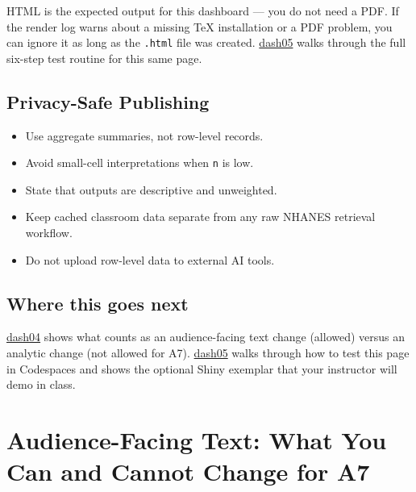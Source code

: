 \documentclass[
  letterpaper,
  DIV=11,
  numbers=noendperiod,
  oneside]{scrreprt}
\providecommand{\tightlist}{%
  \setlength{\itemsep}{0pt}\setlength{\parskip}{0pt}}
\begin{document}
HTML is the expected output for this dashboard --- you do not need a
PDF. If the render log warns about a missing TeX installation or a PDF
problem, you can ignore it as long as the \texttt{.html} file was
created. \href{dash05-testing-privacy-and-shiny-demo.qmd}{dash05} walks
through the full six-step test routine for this same page.

\section*{Privacy-Safe Publishing}\label{privacy-safe-publishing}


\begin{itemize}
\tightlist
\item
  Use aggregate summaries, not row-level records.
\item
  Avoid small-cell interpretations when \texttt{n} is low.
\item
  State that outputs are descriptive and unweighted.
\item
  Keep cached classroom data separate from any raw NHANES retrieval
  workflow.
\item
  Do not upload row-level data to external AI tools.
\end{itemize}

\section*{Where this goes next}\label{where-this-goes-next-16}


\href{dash04-audience-and-ui-text.qmd}{dash04} shows what counts as an
audience-facing text change (allowed) versus an analytic change (not
allowed for A7).
\href{dash05-testing-privacy-and-shiny-demo.qmd}{dash05} walks through
how to test this page in Codespaces and shows the optional Shiny
exemplar that your instructor will demo in class.

\chapter*{Audience-Facing Text: What You Can and Cannot Change for
A7}\label{audience-facing-text-what-you-can-and-cannot-change-for-a7}
\end{document}
